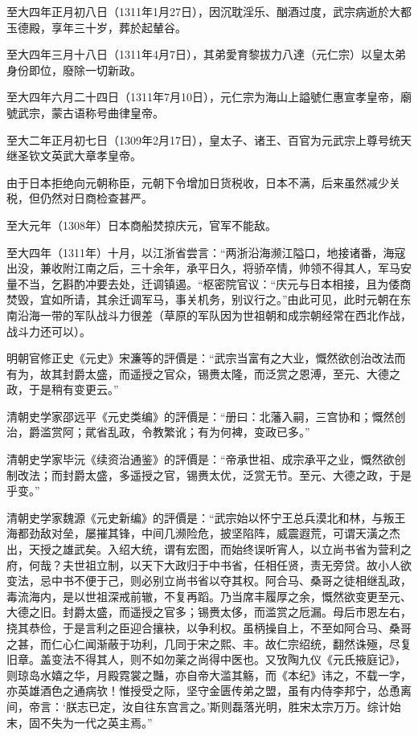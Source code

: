 至大四年正月初八日（1311年1月27日），因沉耽淫乐、酗酒过度，武宗病逝於大都玉德殿，享年三十岁，葬於起輦谷。

至大四年三月十八日（1311年4月7日），其弟愛育黎拔力八達（元仁宗）以皇太弟身份即位，廢除一切新政。

至大四年六月二十四日（1311年7月10日），元仁宗为海山上謚號仁惠宣孝皇帝，廟號武宗，蒙古语称号曲律皇帝。

至大二年正月初七日（1309年2月17日），皇太子、诸王、百官为元武宗上尊号统天继圣钦文英武大章孝皇帝。

由于日本拒绝向元朝称臣，元朝下令增加日货税收，日本不满，后来虽然减少关税，但仍然对日商检查甚严。

至大元年（1308年）日本商船焚掠庆元，官军不能敌。

至大四年（1311年）十月，以江浙省尝言：“两浙沿海濒江隘口，地接诸番，海寇出没，兼收附江南之后，三十余年，承平日久，将骄卒情，帅领不得其人，军马安量不当，乞斟酌冲要去处，迁调镇遏。“枢密院官议：“庆元与日本相接，且为倭商焚毁，宜如所请，其余迁调军马，事关机务，别议行之。”由此可见，此时元朝在东南沿海一带的军队战斗力很差（草原的军队因为世祖朝和成宗朝经常在西北作战，战斗力还可以）。

明朝官修正史《元史》宋濂等的評價是：“武宗当富有之大业，慨然欲创治改法而有为，故其封爵太盛，而遥授之官众，锡赉太隆，而泛赏之恩溥，至元、大德之政，于是稍有变更云。”

清朝史学家邵远平《元史类编》的評價是：“册曰：北藩入嗣，三宫协和；慨然创治，爵滥赏阿；貮省乱政，令教繁讹；有为何裨，变政已多。”

清朝史学家毕沅《续资治通鉴》的評價是：“帝承世祖、成宗承平之业，慨然欲创制改法；而封爵太盛，多遥授之官，锡赉太优，泛赏无节。至元、大德之政，于是乎变。”

清朝史学家魏源《元史新编》的評價是：“武宗始以怀宁王总兵漠北和林，与叛王海都劲敌对垒，屡摧其锋，中间几濒险危，披坚陷阵，威震遐荒，可谓天潢之杰出，天授之雄武矣。入绍大统，谓有宏图，而始终误听宵人，以立尚书省为营利之府，何哉？夫世祖立制，以天下大政归于中书省，任相任贤，责无旁贷。故小人欲变法，忌中书不便于己，则必别立尚书省以夺其权。阿合马、桑哥之徒相继乱政，毒流海内，是以世祖深戒前辙，不复再蹈。乃当席丰履厚之余，慨然欲变更至元、大德之旧。封爵太盛，而遥授之官多；锡赉太侈，而滥赏之卮漏。母后市恩左右，挠其恭俭，于是言利之臣迎合攘袂，以争利权。虽柄操自上，不至如阿合马、桑哥之甚，而仁心仁闻渐蔽于功利，几同于宋之熙、丰。故仁宗绍统，翻然诛殛，尽复旧章。盖变法不得其人，则不如勿薬之尚得中医也。又攷陶九仪《元氏掖庭记》，则琼岛水嬉之华，月殿霓裳之豔，亦自帝大滥其觞，而《本纪》讳之，不载一字，亦英雄酒色之通病欤！惟授受之际，坚守金匮传弟之盟，虽有内侍李邦宁，怂恿离间，帝言：‘朕志已定，汝自往东宫言之。’斯则磊落光明，胜宋太宗万万。综计始末，固不失为一代之英主焉。”

